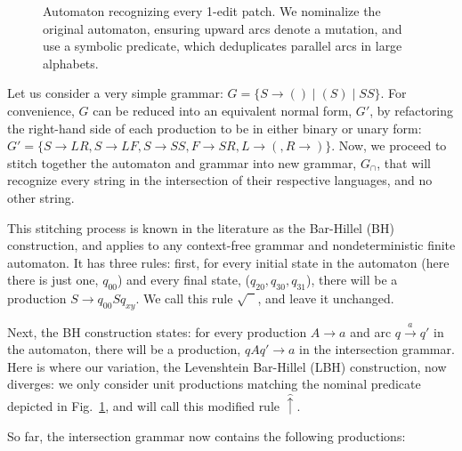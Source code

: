 \documentclass[sigplan,acmsmall,nonacm,screen]{acmart}\settopmatter{printfolios=false,printccs=false,printacmref=false}
\begin{document}
\begin{figure}[h!]
{
  }
  \caption{Automaton recognizing every 1-edit patch. We nominalize the original automaton, ensuring upward arcs denote a mutation, and use a symbolic predicate, which deduplicates parallel arcs in large alphabets.}\label{fig:lev_automaton}\vspace{-5pt}
\end{figure}

Let us consider a very simple grammar: $G = \{S \rightarrow ( ) \mid ( S ) \mid S S\}$. For convenience, $G$ can be reduced into an equivalent normal form, $G'$, by refactoring the right-hand side of each production to be in either binary or unary form: $G'= \{S \rightarrow L R, S \rightarrow L F, S \rightarrow S S, F \rightarrow S R, L \rightarrow (, R \rightarrow )\}$. Now, we proceed to stitch together the automaton and grammar into new grammar, $G_\cap$, that will recognize every string in the intersection of their respective languages, and no other string.

This stitching process is known in the literature as the Bar-Hillel (BH) construction, and applies to any context-free grammar and nondeterministic finite automaton. It has three rules: first, for every initial state in the automaton (here there is just one, $q_{00}$) and every final state, ($q_{20}, q_{30}, q_{31}$), there will be a production $S\rightarrow q_{00}Sq_{xy}$. We call this rule $\sqrt{\phantom{S}}$, and leave it unchanged.

Next, the BH construction states: for every production $A\rightarrow a$ and arc $q \overset{a}{\rightarrow} q'$ in the automaton, there will be a production, $qAq'\rightarrow a$ in the intersection grammar. Here is where our variation, the Levenshtein Bar-Hillel (LBH) construction, now diverges: we only consider unit productions matching the nominal predicate depicted in Fig.~\ref{fig:lev_automaton}, and will call this modified rule $\hat\uparrow$.

So far, the intersection grammar now contains the following productions:\vspace{-5pt}
\end{document}
